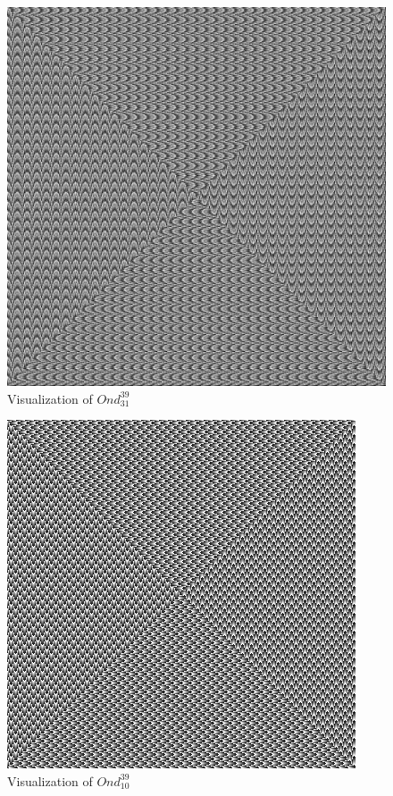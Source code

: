 \documentclass[11pt,reqno]{amsart}
\theoremstyle{mydef}
\begin{document}
\begin{figure}
\centering
\includegraphics[scale=.3]{N31k39b.png}
\caption{Visualization of $Ond^{39}_{31}$}
\label{fig:viz3139}
\end{figure}

\begin{figure}[h]
\centering
\includegraphics[scale=.9]{N10k39a.png}
\caption{Visualization of $Ond^{39}_{10}$}
\label{fig:viz1039}
\end{figure}
\end{document}
